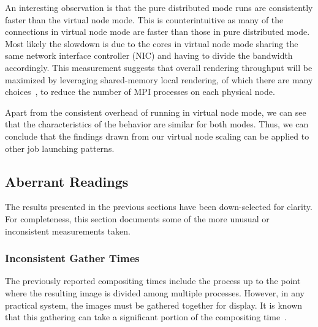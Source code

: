 \documentclass{vgtc}                          %
\newcommand*{\lcite}[1]{~\cite{#1}}
\begin{document}
An interesting observation is that the pure distributed mode runs are consistently faster than the virtual node mode.
This is counterintuitive as many of the connections in virtual node mode are faster than those in pure distributed mode.
Most likely the slowdown is due to the cores in virtual node mode sharing the same network interface controller (NIC) and having to divide the bandwidth accordingly.
This measurement suggests that overall rendering throughput will be maximized by leveraging shared-memory local rendering, of which there are many choices\lcite{OpenSWR,Wald2014,Knoll2014,Larsen2015:RayTrace,Moreland2016:VTKm}, to reduce the number of MPI processes on each physical node.

Apart from the consistent overhead of running in virtual node mode, we can see that the characteristics of the behavior are similar for both modes.
Thus, we can conclude that the findings drawn from our virtual node scaling can be applied to other job launching patterns.

\subsection{Aberrant Readings}

The results presented in the previous sections have been down-selected for clarity.
For completeness, this section documents some of the more unusual or inconsistent measurements taken.

\subsubsection{Inconsistent Gather Times}
\label{sec:Gather}

The previously reported compositing times include the process up to the point where the resulting image is divided among multiple processes.
However, in any practical system, the images must be gathered together for display.
It is known that this gathering can take a significant portion of the compositing time\lcite{Rabenseifner2004,Moreland2011:SC,Larsen2016,Nonaka2018}.
\end{document}
